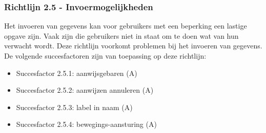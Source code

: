 \subsubsection{Richtlijn 2.5 - Invoermogelijkheden}
Het invoeren van gegevens kan voor gebruikers met een beperking een lastige opgave zijn. Vaak zijn die gebruikers niet in staat om te doen wat van hun verwacht wordt. Deze richtlijn voorkomt problemen bij het invoeren van gegevens. De volgende succesfactoren zijn van toepassing op deze richtlijn: 
\begin{itemize}
    \item Succesfactor 2.5.1: aanwijsgebaren (A)
     \item Succesfactor 2.5.2: aanwijzen annuleren (A)
     \item Succesfactor 2.5.3: label in naam (A)
          \item Succesfactor 2.5.4: bewegings-aansturing (A)
\end{itemize}
\newpage
